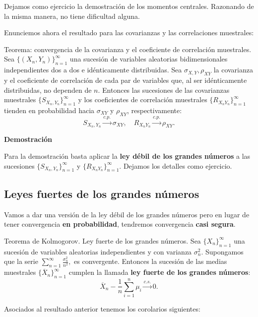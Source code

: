 \documentclass[
  letterpaper,
  DIV=11,
  numbers=noendperiod]{scrreprt}
\begin{document}
Dejamos como ejercicio la demostración de los momentos centrales.
Razonando de la misma manera, no tiene dificultad alguna.

Enunciemos ahora el resultado para las covarianzas y las correlaciones
muestrales:

Teorema: convergencia de la covarianza y el coeficiente de correlación
muestrales. Sea \(\{(X_n,Y_n)\}_{n=1}^\infty\) una sucesión de variables
aleatorias bidimensionales independientes dos a dos e idénticamente
distribuidas. Sea \(\sigma_{X,Y}, \rho_{XY}\) la covarianza y el
coeficiente de correlación de cada par de variables que, al ser
idénticamente distribuidas, no dependen de \(n\). Entonces las
sucesiones de las covarianzas muestrales
\(\{S_{X_n,Y_n}\}_{n=1}^\infty\) y los coeficientes de correlación
muestrales \(\{R_{X_nY_n}\}_{n=1}^\infty\) tienden en probabilidad hacia
\(\sigma_{XY}\) y \(\rho_{XY}\), respectivamente: \[
S_{X_n,Y_n}\stackrel{c.p.}{\longrightarrow}\sigma_{XY},\quad R_{X_nY_n}\stackrel{c.p.}{\longrightarrow}\rho_{XY}.
\]

\textbf{Demostración}

Para la demostración basta aplicar la \textbf{ley débil de los grandes
números} a las sucesiones \(\{S_{X_n,Y_n}\}_{n=1}^\infty\) y
\(\{R_{X_nY_n}\}_{n=1}^\infty\). Dejamos los detalles como ejercicio.

\hypertarget{leyes-fuertes-de-los-grandes-nuxfameros}{%
\subsection{Leyes fuertes de los grandes
números}\label{leyes-fuertes-de-los-grandes-nuxfameros}}

Vamos a dar una versión de la ley débil de los grandes números pero en
lugar de tener convergencia \textbf{en probabilidad}, tendremos
convergencia \textbf{casi segura}.

Teorema de Kolmogorov. Ley fuerte de los grandes números. Sea
\(\{X_n\}_{n=1}^\infty\) una sucesión de variables aleatorias
independientes y con varianza \(\sigma_n^2\). Supongamos que la serie
\(\sum\limits_{n=1}^\infty \frac{\sigma_n^2}{n^2},\) es convergente.
Entonces la sucesión de las medias muestrales
\(\{\overline{X}_n\}_{n=1}^\infty\) cumplen la llamada \textbf{ley
fuerte de los grandes números}: \[
\overline{X}_n-\frac{1}{n}\sum_{i=1}^n \mu_i \stackrel{c.s.}{\longrightarrow} 0.
\]

Asociados al resultado anterior tenemos los corolarios siguientes:
\end{document}
